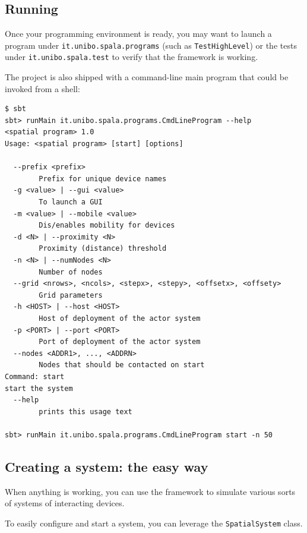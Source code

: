 \documentclass[11pt]{llncs}
\begin{document}
\subsection{Running}

Once your programming environment is ready, you may want to launch a program under \texttt{it.unibo.spala.programs} (such as \texttt{TestHighLevel}) or the tests under \texttt{it.unibo.spala.test} to verify that the framework is working.


The project is also shipped with a command-line main program that could be invoked from a shell:

\begin{lstlisting}[language={},emph={sbt,runMain,\$},emphstyle=\textbf]
$ sbt
sbt> runMain it.unibo.spala.programs.CmdLineProgram --help
<spatial program> 1.0
Usage: <spatial program> [start] [options]

  --prefix <prefix>
        Prefix for unique device names
  -g <value> | --gui <value>
        To launch a GUI
  -m <value> | --mobile <value>
        Dis/enables mobility for devices
  -d <N> | --proximity <N>
        Proximity (distance) threshold
  -n <N> | --numNodes <N>
        Number of nodes
  --grid <nrows>, <ncols>, <stepx>, <stepy>, <offsetx>, <offsety>
        Grid parameters
  -h <HOST> | --host <HOST>
        Host of deployment of the actor system
  -p <PORT> | --port <PORT>
        Port of deployment of the actor system
  --nodes <ADDR1>, ..., <ADDRN>
        Nodes that should be contacted on start
Command: start
start the system
  --help
        prints this usage text
        
sbt> runMain it.unibo.spala.programs.CmdLineProgram start -n 50
\end{lstlisting}

\subsection{Creating a system: the easy way}

When anything is working, you can use the framework to simulate various sorts of systems of interacting devices.

To easily configure and start a system, you can leverage the \texttt{SpatialSystem} class.
\end{document}
